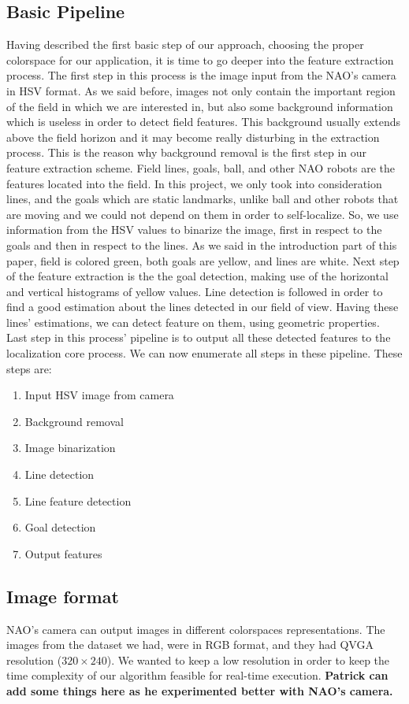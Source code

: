 \documentclass[	DIV=calc,%
							paper=a4,%
							fontsize=9pt,%
							twocolumn]{scrartcl}	 					%
\begin{document}
\subsection{Basic Pipeline}
Having described the first basic step of our approach, choosing the proper colorspace for our application, it is time to go deeper into the feature extraction process.
The first step in this process is the image input from the NAO's camera in HSV format. As we said before, images not only contain the important region of the field in which we are interested in, but also some background information which is useless in order to detect field features. This background usually extends above the field horizon and it may become really disturbing in the extraction process. This is the reason why background removal is the first step in our feature extraction scheme. Field lines, goals, ball, and other NAO robots are the features located into the field. In this project, we only took into consideration lines, and the goals which are static landmarks, unlike ball and other robots that are moving and we could not depend on them in order to self-localize. So, we use information from the HSV values to binarize the image, first in respect to the goals and then in respect to the lines. As we said in the introduction part of this paper, field is colored green, both goals are yellow, and lines are white. Next step of the feature extraction is the the goal detection, making use of the horizontal and vertical histograms of yellow values. Line detection is followed in order to find a good estimation about the lines detected in our field of view. Having these lines' estimations, we can detect feature on them, using geometric properties. Last step in this process' pipeline is to output all these detected features to the localization core process. We can now enumerate all steps in these pipeline. These steps are:
\begin{enumerate}
\item Input HSV image from camera
\item Background removal
\item Image binarization
\item Line detection
\item Line feature detection
\item Goal detection
\item Output features
\end{enumerate}

\subsection{Image format}
NAO's camera can output images in different colorspaces representations. The images from the dataset we had, were in RGB format, and they had QVGA resolution ($320 \times 240$). We wanted to keep a low resolution in order to keep the time complexity of our algorithm feasible for real-time execution. \textbf{Patrick can add some things here as he experimented better with NAO's camera.}
\end{document}
